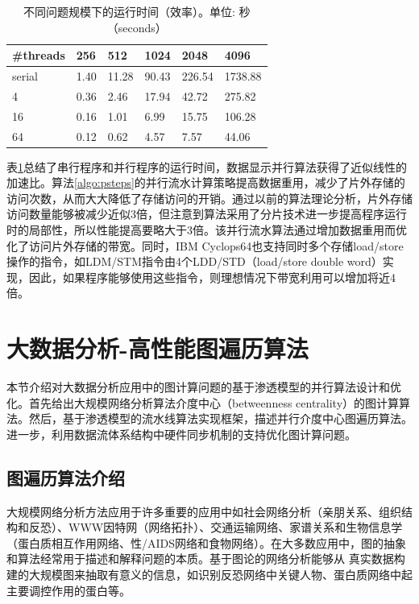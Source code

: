 \begin{flushleft}
\begin{table}
	\begin{center}
		\caption{不同问题规模下的运行时间（效率）。单位: 秒（seconds）} \label{tab:exe_time}
		\begin{tabular}{|l|l|l|l|l|l|}
			\hline
			\#threads & 256 & 512 & 1024 & 2048 & 4096 \\\hline
			serial & 1.40 & 11.28 & 90.43 & 226.54 & 1738.88\\\hline
			4 & 0.36 & 2.46 & 17.94 & 42.72 & 275.82\\\hline
			16 & 0.16 & 1.01 & 6.99 & 15.75 & 106.28\\\hline
			64 & 0.12 & 0.62 & 4.57 & 7.57 & 44.06\\\hline
		\end{tabular}
	\end{center}
\end{table}
表\ref{tab:exe_time}总结了串行程序和并行程序的运行时间，数据显示并行算法获得了近似线性的加速比。算法\ref{algo:psteps}的并行流水计算策略提高数据重用，减少了片外存储的访问次数，从而大大降低了存储访问的开销。通过以前的算法理论分析，片外存储访问数量能够被减少近似3倍，但注意到算法采用了分片技术进一步提高程序运行时的局部性，所以性能提高要略大于3倍。该并行流水算法通过增加数据重用而优化了访问片外存储的带宽。同时，IBM Cyclops64也支持同时多个存储load/store操作的指令，如LDM/STM指令由4个LDD/STD（load/store double word）实现，因此，如果程序能够使用这些指令，则理想情况下带宽利用可以增加将近4倍。




\section{大数据分析-高性能图遍历算法}\label{sec:PM_graph}

本节介绍对大数据分析应用中的图计算问题的基于渗透模型的并行算法设计和优化。首先给出大规模网络分析算法介度中心（betweenness centrality）的图计算算法。然后，基于渗透模型的流水线算法实现框架，描述并行介度中心图遍历算法。进一步，利用数据流体系结构中硬件同步机制的支持优化图计算问题。

\subsection{图遍历算法介绍}
大规模网络分析方法应用于许多重要的应用中如社会网络分析（亲朋关系、组织结构和反恐）、WWW因特网（网络拓扑）、交通运输网络、家谱关系和生物信息学
（蛋白质相互作用网络、性/AIDS网络和食物网络）\citep{network-app-social-Freeman,network-app-social-url,network-cs-acm,network-cs-connections,network-app-web,network-app-internet,network-app-bioinformatics,network-app-nature,network-app-recomb,network-app-aids}。在大多数应用中，图的抽象和算法经常用于描述和解释问题的本质\citep{network-app,network-app-sci}。基于图论的网络分析能够从
真实数据构建的大规模图来抽取有意义的信息，如识别反恐网络中关键人物、蛋白质网络中起主要调控作用的蛋白等。


\end{flushleft}
